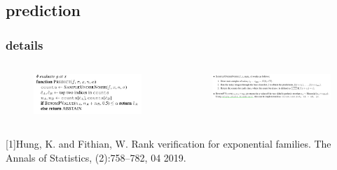 \documentclass[aspectratio=169%
,serif,mathserif]{beamer}
\begin{document}
\subsection{prediction}
\begin{frame}
	\frametitle{details}
	\begin{columns}
		\begin{column}{.4\textwidth}
			\begin{figure}[htbp]
				\includegraphics[width=1\linewidth]{10.png}
			\end{figure}
		\end{column}

		\begin{column}{.6\textwidth}
			\begin{figure}[htbp]
				\includegraphics[width=1\linewidth]{11.png}
			\end{figure}
		\end{column}
	\end{columns}
	[1]Hung, K. and Fithian, W. Rank verification for exponential families. The Annals of Statistics, (2):758–782, 04 2019.
\end{frame}
\end{document}
